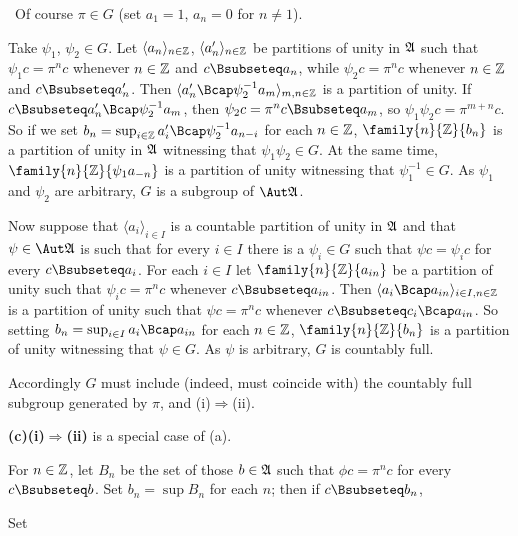 {\Prf\ Of course $\pi\in G$ (set $a_1=1$, $a_n=0$ for $n\ne 1$).

Take $\psi_1$, $\psi_2\in G$.   Let
$\langle a_n\rangle_{n\in\Bbb Z}$,
$\langle a'_n\rangle_{n\in\Bbb Z}$ be partitions of unity
in $\frak A$ such that $\psi_1c=\pi^nc$ whenever $n\in\Bbb Z$ and
$c\Bsubseteq a_n$, while $\psi_2c=\pi^nc$ whenever $n\in\Bbb Z$ and
$c\Bsubseteq a'_n$.   Then
$\langle a'_n\Bcap\psi_2^{-1}a_m\rangle_{m,n\in\Bbb Z}$ is a partition
of unity.   If $c\Bsubseteq a'_n\Bcap\psi_2^{-1}a_m$, then
$\psi_2c=\pi^nc\Bsubseteq a_m$, so $\psi_1\psi_2c=\pi^{m+n}c$.   So if
we set $b_n=\sup_{i\in\Bbb Z}a'_i\Bcap\psi_2^{-1}a_{n-i}$ for each
$n\in\Bbb Z$, $\family{n}{\Bbb Z}{b_n}$ is a partition of unity in
$\frak A$ witnessing that $\psi_1\psi_2\in G$.
At the same time, $\family{n}{\Bbb Z}{\psi_1a_{-n}}$ is a partition of
unity witnessing that $\psi_1^{-1}\in G$.   As $\psi_1$ and $\psi_2$ are
arbitrary, $G$ is a subgroup of $\Aut\frak A$.

Now suppose that $\langle a_i\rangle_{i\in I}$ is a countable partition
of unity in
$\frak A$ and that $\psi\in\Aut\frak A$ is such that for every $i\in I$
there is a $\psi_i\in G$ such that $\psi c=\psi_ic$ for every
$c\Bsubseteq a_i$.   For each $i\in I$ let $\family{n}{\Bbb Z}{a_{in}}$
be a partition of unity such that $\psi_ic=\pi^nc$ whenever
$c\Bsubseteq a_{in}$.   Then
$\langle a_i\Bcap a_{in}\rangle_{i\in I,n\in\Bbb Z}$ is a partition of
unity such that $\psi c=\pi^nc$ whenever $c\Bsubseteq c_i\Bcap a_{in}$.
So setting $b_n=\sup_{i\in I}a_i\Bcap a_{in}$ for each $n\in\Bbb Z$,
$\family{n}{\Bbb Z}{b_n}$ is a partition of unity witnessing that
$\psi\in G$.   As $\psi$ is arbitrary, $G$ is countably full.\ \Qed

Accordingly $G$ must include (indeed, must coincide with) the countably
full subgroup generated by $\pi$, and (i)$\Rightarrow$(ii).

\medskip

{\bf (c)(i)$\Rightarrow$(ii)} is a special case of (a).

\medskip

 For $n\in\Bbb Z$, let $B_n$ be the set
of those $b\in\frak A$ such that $\phi c=\pi^nc$ for every
$c\Bsubseteq b$.   Set $b_n=\sup B_n$ for each $n$;  then if
$c\Bsubseteq b_n$,


\noindent Set

}
